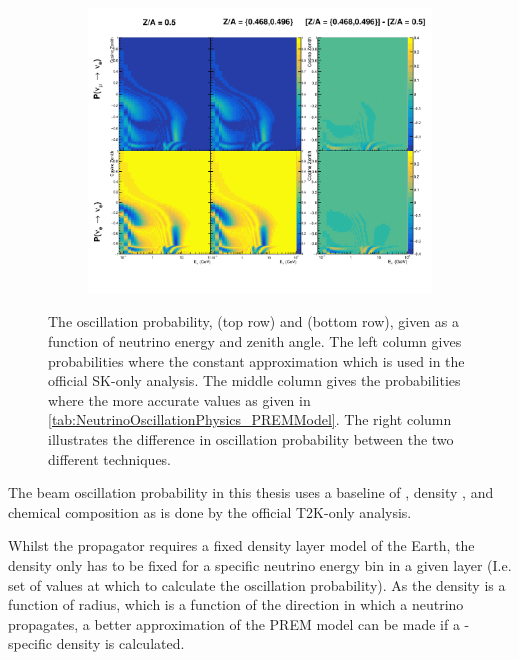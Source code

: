 \begin{figure}[h]
  \begin{subfigure}[t]{\textwidth}
    \includegraphics[width=\textwidth, trim={0mm 0mm 0mm 0mm}, clip,page=1]{Figures/Oscillation/ChemicalComposition.pdf}
  \end{subfigure}
  \caption{The oscillation probability,  (top row) and  (bottom row), given as a function of neutrino energy and zenith angle. The left column gives probabilities where the constant  approximation which is used in the official SK-only analysis. The middle column gives the probabilities where the more accurate  values as given in \autoref{tab:NeutrinoOscillationPhysics_PREMModel}. The right column illustrates the difference in oscillation probability between the two different techniques.}
  \label{fig:Oscillation_SK_ChemicalComposition}
\end{figure}

The beam oscillation probability in this thesis uses a baseline of , density  \cite{Hagiwara2011}, and chemical composition  as is done by the official T2K-only analysis.

Whilst the propagator requires a fixed density layer model of the Earth, the density only has to be fixed for a specific neutrino energy  bin in a given layer (I.e. set of values at which to calculate the oscillation probability). As the density is a function of radius, which is a function of the direction in which a neutrino propagates, a better approximation of the PREM model can be made if a -specific density is calculated. 


